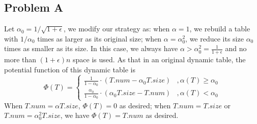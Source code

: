 \documentclass[12pt,onecolumn,a4paper]{article}
\begin{document}
\subsection*{Problem A}
Let $\alpha_0=1/\sqrt{1+\epsilon}$, we modify our strategy as: when $\alpha=1$, we rebuild a table with $1/\alpha_0$ times as larger as its original size; when $\alpha=\alpha_0^2$, we reduce its size $\alpha_0$ times as smaller as its size. In this case, we always have $\alpha>\alpha_0^2=\frac{1}{1+\epsilon}$ and no more than $(1+\epsilon)n$ space is used. As that in an original dynamic table, the potential function of this dynamic table is
\begin{equation}
	\Phi(T)=
	\begin{cases}
		\frac{1}{1-\alpha_0}\cdot(T.num-\alpha_0 T.size)&, \alpha(T)\ge \alpha_0\\
		\frac{\alpha_0}{1-\alpha_0}\cdot(\alpha_0 T.size-T.num)&, \alpha(T)< \alpha_0
	\end{cases}
\end{equation}
When $T.num=\alpha T.size$, $\Phi(T)=0$ as desired; when $T.num=T.size$ or $T.num=\alpha_0^2T.size$, we have $\Phi(T)=T.num$ as desired. 
\end{document}
